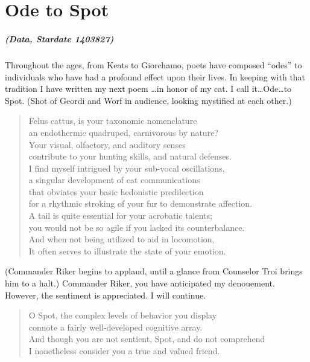 \chapter{Ode to Spot}

\noindent\paragraph{(Data, Stardate 1403827)}
Throughout the ages, from Keats to Giorchamo, poets have
composed ``odes'' to individuals who have had a profound effect
upon their lives.  In keeping with that tradition
I have written my next poem \ldots in honor of my cat.
I call it\ldots{}Ode\ldots{}to Spot.
(Shot of Geordi and Worf in audience,
looking mystified at each other.)

\begin{quotation}
\noindent Felus cattus, is your taxonomic nomenclature \\
an endothermic quadruped, carnivorous by nature? \\
Your visual, olfactory, and auditory senses \\
contribute to your hunting skills, and natural defenses. \\
I find myself intrigued by your sub-vocal oscillations, \\
a singular development of cat communications \\
that obviates your basic hedonistic predilection \\
for a rhythmic stroking of your fur to demonstrate affection. \\
A tail is quite essential for your acrobatic talents; \\
you would not be so agile if you lacked its counterbalance. \\
And when not being utilized to aid in locomotion, \\
It often serves to illustrate the state of your emotion.
\end{quotation}


\noindent(Commander Riker begins to applaud, until a
glance from Counselor Troi brings him to a halt.)
Commander Riker, you have anticipated my denouement.
However, the sentiment is appreciated.  I will continue.


\begin{quotation}
\noindent O Spot, the complex levels of behavior you display \\
connote a fairly well-developed cognitive array. \\
And though you are not sentient, Spot, and do not comprehend \\
I nonetheless consider you a true and valued friend.
\end{quotation}
